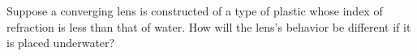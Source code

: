 Suppose a converging lens is constructed of a type of
plastic whose index of refraction is less than that of
water. How will the lens's behavior be different if it
is placed underwater?

